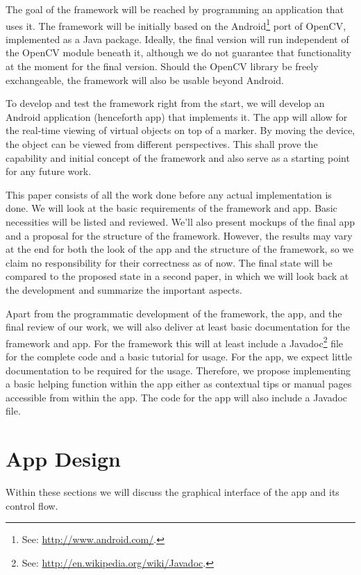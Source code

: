 \documentclass[a4paper,twoside]{article}
\begin{document}
The goal of the framework will be reached by programming an application that uses it.
The framework will be initially based on the Android\footnote{See: \url{http://www.android.com/}.} port\cite{opencvandroid} of OpenCV\cite{opencv}, implemented as a Java package.
Ideally, the final version will run independent of the OpenCV module beneath it, although we do not guarantee that functionality at the moment for the final version.
Should the OpenCV library be freely exchangeable, the framework will also be usable beyond Android.

To develop and test the framework right from the start, we will develop an Android application (henceforth app) that implements it.
The app will allow for the real-time viewing of virtual objects on top of a marker.
By moving the device, the object can be viewed from different perspectives.
This shall prove the capability and initial concept of the framework and also serve as a starting point for any future work.

This paper consists of all the work done before any actual implementation is done.
We will look at the basic requirements of the framework and app.
Basic necessities will be listed and reviewed.
We'll also present mockups of the final app and a proposal for the structure of the framework.
However, the results may vary at the end for both the look of the app and the structure of the framework, so we claim no responsibility for their correctness as of now.
The final state will be compared to the proposed state in a second paper, in which we will look back at the development and summarize the important aspects.

Apart from the programmatic development of the framework, the app, and the final review of our work, we will also deliver at least basic documentation for the framework and app.
For the framework this will at least include a Javadoc\footnote{See: \url{http://en.wikipedia.org/wiki/Javadoc}.} file for the complete code and a basic tutorial for usage.
For the app, we expect little documentation to be required for the usage.
Therefore, we propose implementing a basic helping function within the app either as contextual tips or manual pages accessible from within the app.
The code for the app will also include a Javadoc file.

\section{App Design}

Within these sections we will discuss the graphical interface of the app and its control flow.
\end{document}
